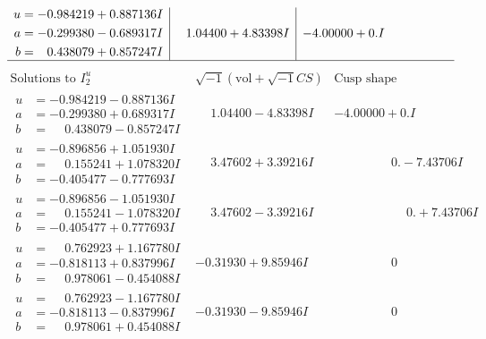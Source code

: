 \documentclass[1p]{elsarticle_modified}
\theoremstyle{definition}
\newcommand{\I}{\sqrt{-1}}
\begin{document}
$$\begin{array}{c|c|c}
\begin{aligned}
u &= -0.984219 + 0.887136 I \\
a &= -0.299380 - 0.689317 I \\
b &= \phantom{-}0.438079 + 0.857247 I\end{aligned}
 & \phantom{-}1.04400 + 4.83398 I & -4.00000 + 0. I\phantom{ +0.000000I}\\
 \hline 
 \end{array}$$\newpage$$\begin{array}{c|c|c}  
\text{Solutions to }I^u_{2}& \I (\text{vol} + \sqrt{-1}CS) & \text{Cusp shape}\\
 \hline 
\begin{aligned}
u &= -0.984219 - 0.887136 I \\
a &= -0.299380 + 0.689317 I \\
b &= \phantom{-}0.438079 - 0.857247 I\end{aligned}
 & \phantom{-}1.04400 - 4.83398 I & -4.00000 + 0. I\phantom{ +0.000000I} \\ \hline\begin{aligned}
u &= -0.896856 + 1.051930 I \\
a &= \phantom{-}0.155241 + 1.078320 I \\
b &= -0.405477 - 0.777693 I\end{aligned}
 & \phantom{-}3.47602 + 3.39216 I & \phantom{-0.000000 } 0. - 7.43706 I \\ \hline\begin{aligned}
u &= -0.896856 - 1.051930 I \\
a &= \phantom{-}0.155241 - 1.078320 I \\
b &= -0.405477 + 0.777693 I\end{aligned}
 & \phantom{-}3.47602 - 3.39216 I & \phantom{-0.000000 -}0. + 7.43706 I \\ \hline\begin{aligned}
u &= \phantom{-}0.762923 + 1.167780 I \\
a &= -0.818113 + 0.837996 I \\
b &= \phantom{-}0.978061 - 0.454088 I\end{aligned}
 & -0.31930 + 9.85946 I & \phantom{-0.000000 } 0 \\ \hline\begin{aligned}
u &= \phantom{-}0.762923 - 1.167780 I \\
a &= -0.818113 - 0.837996 I \\
b &= \phantom{-}0.978061 + 0.454088 I\end{aligned}
 & -0.31930 - 9.85946 I & \phantom{-0.000000 } 0 \\ \hline\begin{aligned}

\end{aligned}
\end{array}$$
\end{document}
